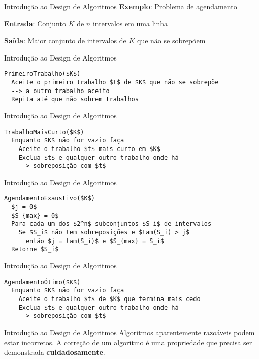 \documentclass[10pt]{beamer}
\begin{document}
\begin{frame}{Introdução ao Design de Algoritmos}
    \huge
    \textbf{Exemplo}: Problema de agendamento
    
    \Large
    \textbf{Entrada}: Conjunto $K$ de $n$ intervalos em uma linha

    \textbf{Saída}: Maior conjunto de intervalos de $K$ que não se sobrepõem
\end{frame}

\begin{frame}[fragile]{Introdução ao Design de Algoritmos}
    \begin{lstlisting}
PrimeiroTrabalho($K$)
  Aceite o primeiro trabalho $t$ de $K$ que não se sobrepõe
  --> a outro trabalho aceito
  Repita até que não sobrem trabalhos
    \end{lstlisting}
\end{frame}

\begin{frame}[fragile]{Introdução ao Design de Algoritmos}
    \begin{lstlisting}
TrabalhoMaisCurto($K$)
  Enquanto $K$ não for vazio faça
    Aceite o trabalho $t$ mais curto em $K$
    Exclua $t$ e qualquer outro trabalho onde há
    --> sobreposição com $t$
    \end{lstlisting}
\end{frame}

\begin{frame}[fragile]{Introdução ao Design de Algoritmos}
    \begin{lstlisting}
AgendamentoExaustivo($K$)
  $j = 0$
  $S_{max} = 0$
  Para cada um dos $2^n$ subconjuntos $S_i$ de intervalos
    Se $S_i$ não tem sobreposições e $tam(S_i) > j$
      então $j = tam(S_i)$ e $S_{max} = S_i$
  Retorne $S_i$
    \end{lstlisting}
\end{frame}

\begin{frame}[fragile]{Introdução ao Design de Algoritmos}
    \begin{lstlisting}
AgendamentoÓtimo($K$)
  Enquanto $K$ não for vazio faça
    Aceite o trabalho $t$ de $K$ que termina mais cedo
    Exclua $t$ e qualquer outro trabalho onde há
    --> sobreposição com $t$
    \end{lstlisting}
\end{frame}

\begin{frame}{Introdução ao Design de Algoritmos}
    \huge
    Algoritmos aparentemente razoáveis podem estar incorretos. A correção de um algoritmo é uma propriedade que precisa ser demonstrada \textbf{cuidadosamente}.
\end{frame}
\end{document}

